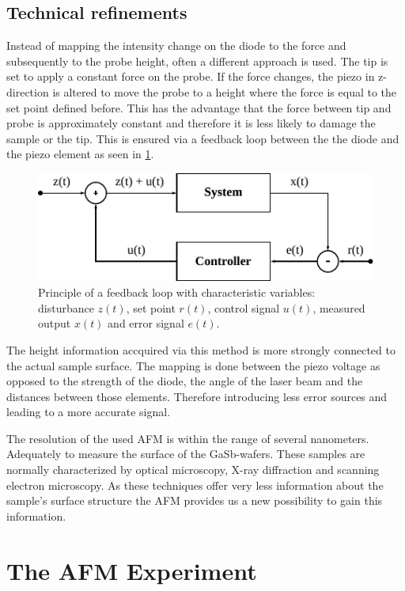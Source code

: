 \documentclass[paper=a4,fontsize=10pt,DIV=18,twocolumn,parskip=half]{scrartcl}
\numberwithin{equation}{section}    %
\begin{document}
\subsection{Technical refinements}
Instead of mapping the intensity change on the diode to the force and 
subsequently to the probe height, often a different approach is used. The tip is 
set to apply a constant force on the probe. If the force changes, the piezo in 
z-direction is altered to move the probe to a height where the force is equal to 
the set point defined before. This has the advantage that the force between tip 
and probe is approximately constant and therefore it is less likely to damage 
the sample or the tip. This is ensured via a feedback loop between the the diode 
and the piezo element as seen in \cref{control_loop}.

\begin{figure}
    \centering
    \includegraphics{Bilder/control_loop.pdf}
    \caption{Principle of a feedback loop with characteristic variables: 
    disturbance $z(t)$, set point $r(t)$, control signal $u(t)$, measured output 
    $x(t)$ and error signal $e(t)$.}
    \label{control_loop}
\end{figure}

The height information accquired via this method is more strongly connected to 
the actual sample surface. The mapping is done between the piezo voltage as 
opposed to the strength of the diode, the angle of the laser beam and the 
distances between those elements. Therefore introducing less error sources and 
leading to a more accurate signal.

The resolution of the used AFM is within the range of several nanometers. Adequately
to measure the surface of the GaSb-wafers. These samples are normally characterized 
by optical microscopy, X-ray diffraction and scanning electron microscopy. As these 
techniques offer very less information about the sample's surface structure the AFM 
provides us a new possibility to gain this information.

\section{The AFM Experiment}
\label{Experiment}
\end{document}
